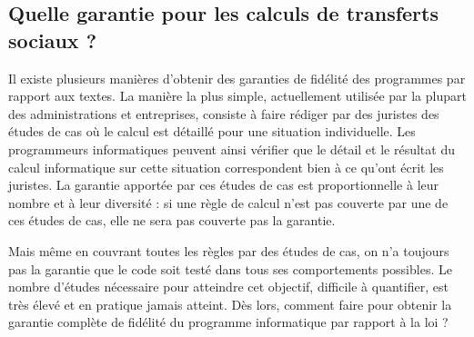 \subsection{Quelle garantie pour les calculs de transferts sociaux ?}

%

Il existe plusieurs manières d'obtenir des garanties de fidélité des programmes par rapport aux textes. La manière la plus simple, actuellement utilisée par la plupart des administrations et entreprises, consiste à faire rédiger par des juristes des études de cas où le calcul est détaillé pour une situation individuelle. Les programmeurs informatiques peuvent ainsi vérifier que le détail et le résultat du calcul informatique sur cette situation correspondent bien à ce qu'ont écrit les juristes. La garantie apportée par ces études de cas est proportionnelle à leur nombre et à leur diversité : si une règle de calcul n'est pas couverte par une de ces études de cas, elle ne sera pas couverte pas la garantie.

Mais même en couvrant toutes les règles par des études de cas, on n'a toujours pas la garantie que le code soit testé dans tous ses comportements possibles. Le nombre d'études nécessaire pour atteindre cet objectif, difficile à quantifier, est très élevé et en pratique jamais atteint. Dès lors, comment faire pour obtenir la garantie complète de fidélité du programme informatique par rapport à la loi ?

